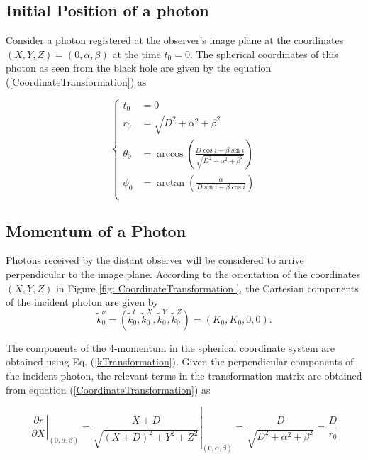\subsection{Initial Position of a photon}

Consider a photon registered at the observer's image plane at the coordinates $(X,Y,Z) = (0, \alpha, \beta)$ at the time $t_0 = 0$. The spherical coordinates of this photon as seen from the black hole are given by the equation (\ref{CoordinateTransformation}) as

\begin{equation}
\begin{cases}
t_0 &= 0\\
r_0 &= \sqrt{D^2 + \alpha^2 + \beta^2} \\
\theta_0 &= \arccos \left( \frac{D \cos i + \beta \sin i}{\sqrt{D^2 + \alpha^2 + \beta^2}}\right)\\
\phi_0 &= \arctan \left( \frac{\alpha}{D\sin i - \beta \cos i} \right) \\
\end{cases} 
\end{equation}

\subsection{Momentum of a Photon}

Photons received by the distant observer will be considered to arrive perpendicular to the image plane. According to the orientation of the coordinates $(X,Y,Z)$ in Figure \ref{fig: CoordinateTransformation }, the Cartesian components of the incident photon are given by
\begin{equation}
\tilde{k}^\nu_0 =\left( \tilde{k}^t_0, \tilde{k}^X_0, \tilde{k}^Y_0, \tilde{k}^Z_0 \right) = \left( K_0, K_0, 0, 0 \right).
\end{equation}

The components of the 4-momentum in the spherical coordinate system  are obtained using  Eq. (\ref{kTransformation}). Given the perpendicular components of the incident photon, the relevant terms in the transformation matrix are obtained from equation (\ref{CoordinateTransformation}) as

\begin{equation}
\left. \frac{\partial r}{\partial X} \right|_{(0,\alpha,\beta)}= \left.\frac{X+D}{\sqrt{(X+D)^2 + Y^2 + Z^2}}\right|_{(0,\alpha,\beta)}
= \frac{D}{\sqrt{D^2 + \alpha^2 + \beta^2}} = \frac{D}{r_0}
\end{equation}

